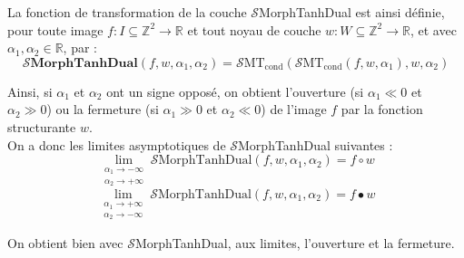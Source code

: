 \vspace{-1.0mm}
La fonction de transformation de la couche $\mathcal{S}$MorphTanhDual est ainsi définie, pour toute image $f: I \subseteq \mathbb{Z}^2 \rightarrow \mathbb{R}$ et tout noyau de couche $w: W \subseteq \mathbb{Z}^2 \rightarrow \mathbb{R}$, et avec $\alpha_1,\alpha_2 \in \mathbb{R}$, par : \\

\vspace{-4.0mm}
\begin{equation}
    \pmb{\mathcal{S}}\textbf{MorphTanhDual} (f,w,\alpha_1,\alpha_2) = \mathcal{S}\text{MT}_{\text{cond}} \left ( \mathcal{S}\text{MT}_{\text{cond}} ( f , w , \alpha_1 ) , w , \alpha_2 \right )
    \label{SMorphTanhDual}
\end{equation}

\vspace{5mm}
\noindent Ainsi, si $\alpha_1$ et $\alpha_2$ ont un signe opposé, on obtient l'ouverture (si $\alpha_1 \ll 0$ et $\alpha_2 \gg 0$) ou la fermeture (si $\alpha_1 \gg 0$ et $\alpha_2 \ll 0$) de l'image $f$ par la fonction structurante $w$. \\

\vspace{-1.6mm}
\noindent On a donc les limites asymptotiques de $\mathcal{S}$MorphTanhDual suivantes : \\

\vspace{-5.0mm}
\begin{equation*} 
    \lim_{\substack{\alpha_1 \rightarrow -\infty \\ \alpha_2 \rightarrow +\infty}} \mathcal{S}\text{MorphTanhDual}(f,w,\alpha_1,\alpha_2) = f \circ w
\end{equation*} 
\begin{equation*} 
    \lim_{\substack{\alpha_1 \rightarrow +\infty \\ \alpha_2 \rightarrow -\infty}} \mathcal{S}\text{MorphTanhDual}(f,w,\alpha_1,\alpha_2) = f \bullet w
\end{equation*}

\vspace{2.5mm}
\noindent On obtient bien avec $\mathcal{S}$MorphTanhDual, aux limites, l'ouverture et la fermeture.
